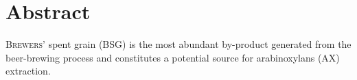 \chapter*{Abstract}

\lettrine[lines=3]{B}{rewers'} spent grain (BSG) is the most abundant by-product generated from the beer-brewing process and constitutes a potential source for arabinoxylans (AX) extraction. \lipsum[6]
